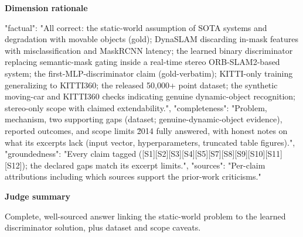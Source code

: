 \documentclass[10pt]{article}
\begin{document}
\textbf{Dimension rationale}
\begin{EvidenceText}
{
  "factual": "All correct: the static-world assumption of SOTA systems and degradation with movable objects (gold); DynaSLAM discarding in-mask features with misclassification and MaskRCNN latency; the learned binary discriminator replacing semantic-mask gating inside a real-time stereo ORB-SLAM2-based system; the first-MLP-discriminator claim (gold-verbatim); KITTI-only training generalizing to KITTI360; the released 50,000+ point dataset; the synthetic moving-car and KITTI360 checks indicating genuine dynamic-object recognition; stereo-only scope with claimed extendability.",
  "completeness": "Problem, mechanism, two supporting gaps (dataset; genuine-dynamic-object evidence), reported outcomes, and scope limits \u2014 fully answered, with honest notes on what its excerpts lack (input vector, hyperparameters, truncated table figures).",
  "groundedness": "Every claim tagged ([S1][S2][S3][S4][S5][S7][S8][S9][S10][S11][S12]); the declared gaps match its excerpt limits.",
  "sources": "Per-claim attributions including which sources support the prior-work criticisms."
}
\end{EvidenceText}

\textbf{Judge summary}
\begin{EvidenceText}
Complete, well-sourced answer linking the static-world problem to the learned discriminator solution, plus dataset and scope caveats.
\end{EvidenceText}
\end{document}
